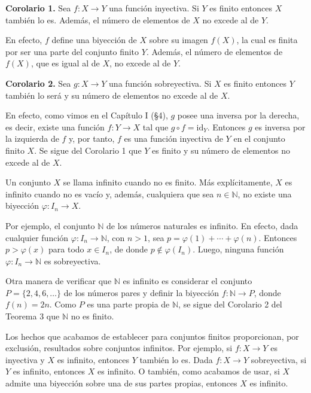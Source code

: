 \textbf{Corolario 1.} Sea \( f: X \to Y \) una función inyectiva. Si \( Y \) es finito entonces \( X \) también lo es. Además, el número de elementos de \( X \) no excede al de \( Y \).

En efecto, \( f \) define una biyección de \( X \) sobre su imagen \( f(X) \), la cual es finita por ser una parte del conjunto finito \( Y \). Además, el número de elementos de \( f(X) \), que es igual al de \( X \), no excede al de \( Y \).

\textbf{Corolario 2.} Sea \( g: X \to Y \) una función sobreyectiva. Si \( X \) es finito entonces \( Y \) también lo será y su número de elementos no excede al de \( X \).

En efecto, como vimos en el Capítulo I (§4), \( g \) posee una inversa por la derecha, es decir, existe una función \( f: Y \to X \) tal que \( g \circ f = \text{id}_Y \). Entonces \( g \) es inversa por la izquierda de \( f \) y, por tanto, \( f \) es una función inyectiva de \( Y \) en el conjunto finito \( X \). Se sigue del Corolario 1 que \( Y \) es finito y su número de elementos no excede al de \( X \).

Un conjunto \( X \) se llama infinito cuando no es finito. Más explícitamente, \( X \) es infinito cuando no es vacío y, además, cualquiera que sea \( n \in \mathbb{N} \), no existe una biyección \( \varphi: I_n \to X \).

Por ejemplo, el conjunto \( \mathbb{N} \) de los números naturales es infinito. En efecto, dada cualquier función \( \varphi: I_n \to \mathbb{N} \), con \( n > 1 \), sea \( p = \varphi(1) + \cdots + \varphi(n) \). Entonces \( p > \varphi(x) \) para todo \( x \in I_n \), de donde \( p \notin \varphi(I_n) \). Luego, ninguna función \( \varphi: I_n \to \mathbb{N} \) es sobreyectiva.

Otra manera de verificar que \( \mathbb{N} \) es infinito es considerar el conjunto \( P = \{2, 4, 6, \dots\} \) de los números pares y definir la biyección \( f: \mathbb{N} \to P \), donde \( f(n) = 2n \). Como \( P \) es una parte propia de \( \mathbb{N} \), se sigue del Corolario 2 del Teorema 3 que \( \mathbb{N} \) no es finito.

Los hechos que acabamos de establecer para conjuntos finitos proporcionan, por exclusión, resultados sobre conjuntos infinitos. Por ejemplo, si \( f: X \to Y \) es inyectiva y \( X \) es infinito, entonces \( Y \) también lo es. Dada \( f: X \to Y \) sobreyectiva, si \( Y \) es infinito, entonces \( X \) es infinito. O también, como acabamos de usar, si \( X \) admite una biyección sobre una de sus partes propias, entonces \( X \) es infinito.

